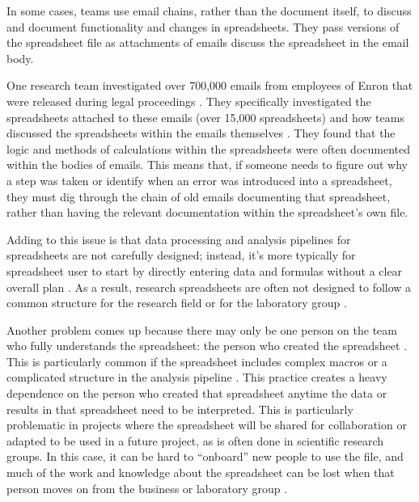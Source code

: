 \documentclass[]{tufte-book}
\begin{document}
In some cases, teams use email chains, rather than the document itself, to
discuss and document functionality and changes in spreadsheets. They pass
versions of the spreadsheet file as attachments of emails discuss the
spreadsheet in the email body.

One research team investigated over 700,000 emails from employees of Enron that
were released during legal proceedings \citep{hermans2015enron}. They specifically
investigated the spreadsheets attached to these emails (over 15,000
spreadsheets) and how teams discussed the spreadsheets within the emails
themselves . They found that the logic and methods of calculations within the
spreadsheets were often documented within the bodies of emails. This means that,
if someone needs to figure out why a step was taken or identify when an error
was introduced into a spreadsheet, they must dig through the chain of old emails
documenting that spreadsheet, rather than having the relevant documentation
within the spreadsheet's own file.

Adding to this issue is that data processing and analysis pipelines for
spreadsheets are not carefully designed; instead, it's more typically for
spreadsheet user to start by directly entering data and formulas without a clear
overall plan \citep{altarawneh2017pilot}. As a result, research spreadsheets are
often not designed to follow a common structure for the research field or for
the laboratory group \citep{anderson2007issues}.

Another problem comes up because there may only be one person on the team who
fully understands the spreadsheet: the person who created the spreadsheet
\citep{myneni2010organization}. This is particularly common if the spreadsheet
includes complex macros or a complicated structure in the analysis pipeline
\citep{creeth1985microcomputer}. This practice creates a heavy dependence on the
person who created that spreadsheet anytime the data or results in that
spreadsheet need to be interpreted. This is particularly problematic in projects
where the spreadsheet will be shared for collaboration or adapted to be used in
a future project, as is often done in scientific research groups. In this case,
it can be hard to ``onboard'' new people to use the file, and much of the work and
knowledge about the spreadsheet can be lost when that person moves on from the
business or laboratory group \citep{creeth1985microcomputer, myneni2010organization}.
\end{document}
